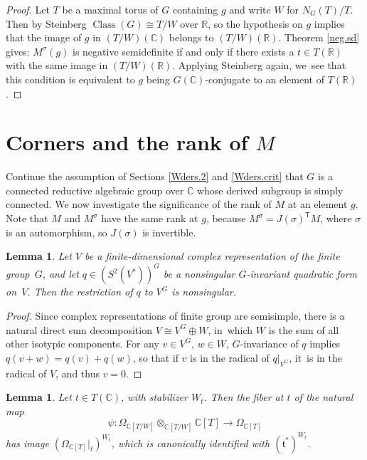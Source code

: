 \documentclass[JEP,XML,SOM,Unicode,NoFloatCountersInSection,published]{cedram}
\newtheorem{lem}[equation]{Lemma}
\theoremstyle{definition}
\let\:\colon
\newcommand{\mft}{\mathfrak{t}}
\newcommand{\trans}{\mathsf{T}}
\newcommand{\R}{\mathbb{R}}
\newcommand{\C}{\mathbb{C}}
\DeclareMathOperator{\class}{Class}
\newcommand{\ClG}{\class(G)}
\begin{document}
\begin{proof}
Let $T$ be a maximal torus of $G$ containing $g$ and write $W$ for $N_G(T)/T$. Then by Steinberg \cite[6.4]{St:reg} $\ClG \cong T/W$ over $\R$, so
the hypothesis on $g$ implies that the image of $g$ in $(T/W)(\C)$ belongs to $(T/W)(\R)$. Theorem \ref{neg.sd} gives: $M^\sigma(g)$ is negative semidefinite if and only if there exists a $t \in T(\R)$ with the same image in $(T/W)(\R)$. Applying Steinberg again, we~see that this condition is equivalent to $g$ being $G(\C)$-conjugate to an element of $T(\R)$.
\end{proof}

\section{Corners and the rank of \texorpdfstring{$M$}{M}} \label{corners.sec}

Continue the assumption of Sections \ref{Wders.2} and \ref{Wders.crit} that $G$ is a connected
reductive algebraic group over $\C$ whose derived subgroup is simply connected. We
now investigate the significance of the rank of $M$ at an element $g$.
Note that $M$ and $M^\sigma$ have the same rank at $g$, because $M^\sigma =
J(\sigma)^\trans M$, where $\sigma$ is an automorphism, so $J(\sigma)$ is
invertible.

\begin{lem}
Let $V$ be a finite-dimensional complex representation of the finite
group~$G$, and let $q\in (S^2(V^*))^G$ be a nonsingular $G$-invariant
quadratic form on~$V$. Then the restriction of $q$ to $V^G$ is
nonsingular.
\end{lem}

\begin{proof}
Since complex representations of finite group are semisimple, there is a
natural direct sum decomposition $V\cong V^G\oplus W$, in~which $W$ is
the sum of all other isotypic components. For any $v\in V^G$, $w\in W$,
$G$-invariance of $q$ implies $q(v+w)=q(v)+q(w)$, so that if $v$ is in
the radical of $q|_{V^G}$, it~is in the radical of $V$, and thus $v=0$.
\end{proof}

\begin{lem} \label{omega.fiber}
Let $t\in T(\C)$, with stabilizer $W_t$. Then the fiber at $t$ of the natural map
\[
\psi \: \Omega_{\C[T/W]}\otimes_{\C[T/W]}\C[T]\to \Omega_{\C[T]}
\]
has image $(\Omega_{\C[T]}|_t)^{W_t}$, which is canonically identified with $(\mft^*)^{W_t}$.
\end{lem}
\end{document}
